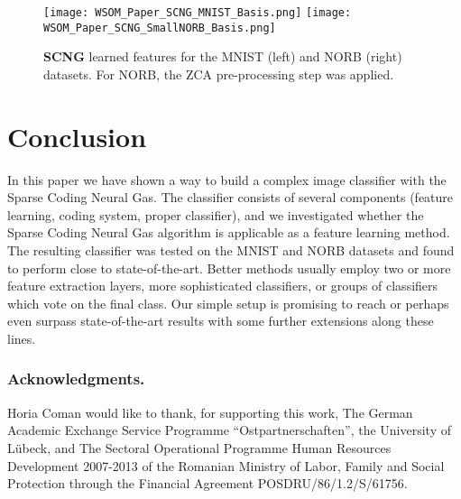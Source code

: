 \documentclass[runningheads,a4paper]{llncs}
\begin{document}
\begin{figure}
\centering
\texttt{[image: WSOM\_Paper\_SCNG\_MNIST\_Basis.png]}
\texttt{[image: WSOM\_Paper\_SCNG\_SmallNORB\_Basis.png]}
\caption{\textbf{SCNG} learned features for the MNIST (left) and NORB (right) datasets. For NORB, the ZCA pre-processing step was applied.}
\label{fig:LearnedFigures}
\end{figure}

\section{Conclusion}

In this paper we have shown a way to build a complex image classifier with the Sparse Coding Neural Gas. The classifier consists of several components (feature learning, coding system, proper classifier), and we investigated whether the Sparse Coding Neural Gas algorithm is applicable as a feature learning method. The resulting classifier was tested on the MNIST and NORB datasets and found to perform close to state-of-the-art. Better methods usually employ two or more feature extraction layers, more sophisticated classifiers, or groups of classifiers which vote on the final class. Our simple setup is promising to reach or perhaps even surpass state-of-the-art results with some further extensions along these lines.

\subsubsection*{Acknowledgments.} Horia Coman would like to thank, for supporting this work, The German Academic Exchange Service Programme ``Ostpartnerschaften'', the University of L\"{u}beck,  and The Sectoral Operational Programme Human Resources Development 2007-2013 of the Romanian Ministry of Labor, Family and Social Protection through the Financial Agreement POSDRU/86/1.2/S/61756.
\end{document}
